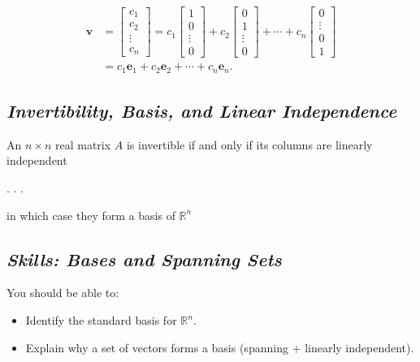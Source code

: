 \documentclass[
  letterpaper,
  DIV=11,
  numbers=noendperiod]{scrartcl}
\providecommand{\tightlist}{%
  \setlength{\itemsep}{0pt}\setlength{\parskip}{0pt}}\usepackage{longtable,booktabs,array}
\begin{document}
\[
\begin{aligned}
\mathbf{v} & =\left[\begin{array}{c}
c_{1} \\
c_{2} \\
\vdots \\
c_{n}
\end{array}\right]=c_{1}\left[\begin{array}{c}
1 \\
0 \\
\vdots \\
0
\end{array}\right]+c_{2}\left[\begin{array}{c}
0 \\
1 \\
\vdots \\
0
\end{array}\right]+\cdots+c_{n}\left[\begin{array}{c}
0 \\
\vdots \\
0 \\
1
\end{array}\right] \\
& =c_{1} \mathbf{e}_{1}+c_{2} \mathbf{e}_{2}+\cdots+c_{n} \mathbf{e}_{n} .
\end{aligned}
\]

\subsection{\texorpdfstring{\emph{Invertibility, Basis, and Linear
Independence}}{Invertibility, Basis, and Linear Independence}}\label{invertibility-basis-and-linear-independence}

An \(n \times n\) real matrix \(A\) is invertible if and only if its
columns are linearly independent

. . .

in which case they form a basis of \(\mathbb{R}^{n}\)

\subsection{\texorpdfstring{\emph{Skills: Bases and Spanning
Sets}}{Skills: Bases and Spanning Sets}}\label{skills-bases-and-spanning-sets}

You should be able to:

\begin{itemize}
\tightlist
\item
  Identify the standard basis for \(\mathbb{R}^{n}\).
\item
  Explain why a set of vectors forms a basis (spanning + linearly
  independent).
\end{itemize}
\end{document}
